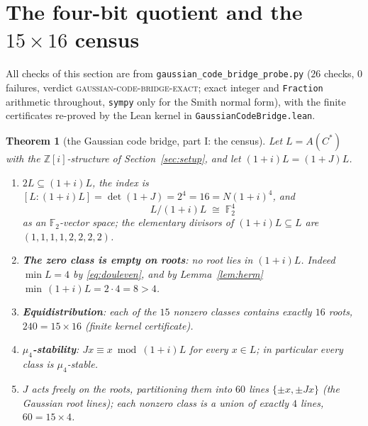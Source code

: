 \documentclass[11pt,a4paper]{article}
\newtheorem{theorem}{Theorem}
\theoremstyle{remark}
\newcommand{\F}{\mathbb F}
\newcommand{\Z}{\mathbb Z}
\newcommand{\Cst}{C^{*}}
\begin{document}
\section{The four-bit quotient and the
\texorpdfstring{$15\times16$}{15 x 16} census}\label{sec:census}

All checks of this section are from
\texttt{gaussian\_code\_bridge\_probe.py} ($26$ checks, $0$ failures,
verdict \textsc{gaussian-code-bridge-exact}; exact integer and
\texttt{Fraction} arithmetic throughout, \texttt{sympy} only for the
Smith normal form), with the finite certificates re-proved by the
Lean kernel in \texttt{GaussianCodeBridge.lean}.

\begin{theorem}[the Gaussian code bridge, part I: the census]
\label{thm:census}
Let $L=A(\Cst)$ with the $\Z[i]$-structure of
Section~\ref{sec:setup}, and let $(1+i)L=(1+J)L$.
\begin{enumerate}
\item[(i)] $2L\subseteq(1+i)L$, the index is
$[L:(1+i)L]=\det(1+J)=2^4=16=N(1+i)^4$, and
\[
L/(1+i)L\;\cong\;\F_2^4
\]
as an $\F_2$-vector space; the elementary divisors of
$(1+i)L\subseteq L$ are $(1,1,1,1,2,2,2,2)$.
\item[(ii)] \textbf{The zero class is empty on roots}: no root lies
in $(1+i)L$.  Indeed $\min L=4$ by \eqref{eq:douleven}, and by
Lemma~\ref{lem:herm} $\min\,(1+i)L=2\cdot4=8>4$.
\item[(iii)] \textbf{Equidistribution}: each of the $15$ nonzero
classes contains exactly $16$ roots, $240=15\times16$
(finite kernel certificate).
\item[(iv)] \textbf{$\mu_4$-stability}: $Jx\equiv x \bmod (1+i)L$ for
every $x\in L$; in particular every class is $\mu_4$-stable.
\item[(v)] $J$ acts freely on the roots, partitioning them into $60$
\emph{lines} $\{\pm x,\pm Jx\}$ (the Gaussian root lines); each
nonzero class is a union of exactly $4$ lines, $60=15\times4$.
\end{enumerate}
\end{theorem}
\end{document}
